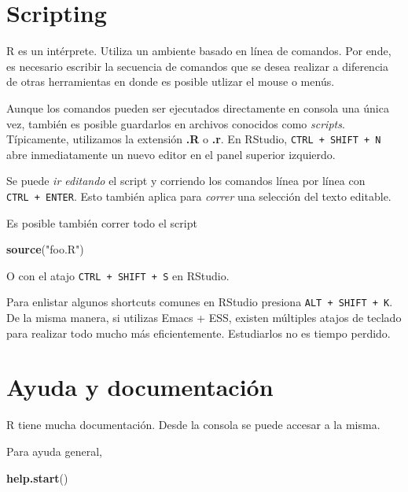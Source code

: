 \documentclass[]{article}
\newenvironment{Shaded}{\begin{snugshade}}{\end{snugshade}}
\newcommand{\KeywordTok}[1]{\textcolor[rgb]{0.13,0.29,0.53}{\textbf{{#1}}}}
\newcommand{\StringTok}[1]{\textcolor[rgb]{0.31,0.60,0.02}{{#1}}}
\newcommand{\NormalTok}[1]{{#1}}
\begin{document}
\section{Scripting}\label{scripting}

R es un intérprete. Utiliza un ambiente basado en línea de comandos. Por
ende, es necesario escribir la secuencia de comandos que se desea
realizar a diferencia de otras herramientas en donde es posible utlizar
el mouse o menús.

Aunque los comandos pueden ser ejecutados directamente en consola una
única vez, también es posible guardarlos en archivos conocidos como
\emph{scripts}. Típicamente, utilizamos la extensión \textbf{.R} o
\textbf{.r}. En RStudio, \texttt{CTRL\ +\ SHIFT\ +\ N} abre
inmediatamente un nuevo editor en el panel superior izquierdo.

Se puede \emph{ir editando} el script y corriendo los comandos línea por
línea con \texttt{CTRL\ +\ ENTER}. Esto también aplica para
\emph{correr} una selección del texto editable.

Es posible también correr todo el script

\begin{Shaded}
\begin{Highlighting}[]
\KeywordTok{source}\NormalTok{(}\StringTok{"foo.R"}\NormalTok{)}
\end{Highlighting}
\end{Shaded}

O con el atajo \texttt{CTRL\ +\ SHIFT\ +\ S} en RStudio.

Para enlistar algunos shortcuts comunes en RStudio presiona
\texttt{ALT\ +\ SHIFT\ +\ K}. De la misma manera, si utilizas Emacs +
ESS, existen múltiples atajos de teclado para realizar todo mucho más
eficientemente. Estudiarlos no es tiempo perdido.

\section{Ayuda y documentación}\label{ayuda-y-documentacion}

R tiene mucha documentación. Desde la consola se puede accesar a la
misma.

Para ayuda general,

\begin{Shaded}
\begin{Highlighting}[]
\KeywordTok{help.start}\NormalTok{()}
\end{Highlighting}
\end{Shaded}
\end{document}
